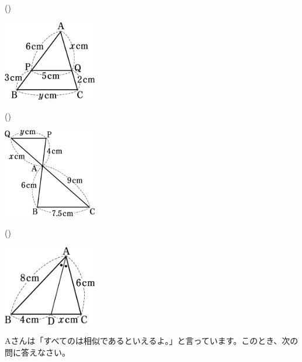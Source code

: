 \documentclass[
  12pt,a4paper,lualatex,ja=standard]{bxjsarticle}
\begin{document}
\begin{flushleft}
\begin{multicols}{2}
\columnbreak

()\hspace{2.5pt}

\def\@captype{figure}
\includegraphics[width=11em]{ttoi2.jpg}

\end{multicols}

\vspace{15mm}

\begin{multicols}{2}
()\hspace{2.5pt}

\def\@captype{figure}
\includegraphics[width=11em]{ttoi3.jpg}


\columnbreak
()\hspace{2.5pt}

\def\@captype{figure}
\includegraphics[width=11em]{ttoi4.jpg}


\end{multicols}

\vfill

\setcounter{skaunta}{0}
\noindent{} \hspace{1pt}Aさんは「すべてのは相似であるといえるよ。」と言っています。このとき、次の問に答えなさい。


\end{flushleft}
\end{document}
